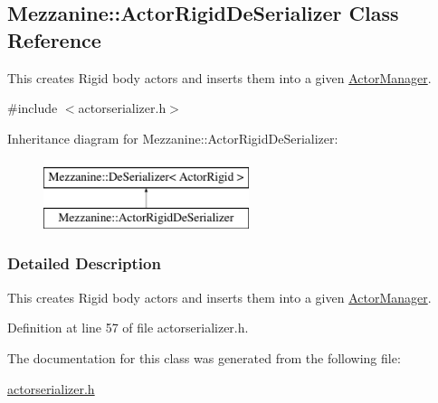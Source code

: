 \hypertarget{classMezzanine_1_1ActorRigidDeSerializer}{
\subsection{Mezzanine::ActorRigidDeSerializer Class Reference}
\label{classMezzanine_1_1ActorRigidDeSerializer}
}


This creates Rigid body actors and inserts them into a given \hyperlink{classMezzanine_1_1ActorManager}{ActorManager}.  




{\ttfamily \#include $<$actorserializer.h$>$}

Inheritance diagram for Mezzanine::ActorRigidDeSerializer:\begin{figure}[H]
\begin{center}
\leavevmode
\includegraphics[height=2.000000cm]{classMezzanine_1_1ActorRigidDeSerializer}
\end{center}
\end{figure}


\subsubsection{Detailed Description}
This creates Rigid body actors and inserts them into a given \hyperlink{classMezzanine_1_1ActorManager}{ActorManager}. 

Definition at line 57 of file actorserializer.h.



The documentation for this class was generated from the following file:\begin{DoxyCompactItemize}
\item 
\hyperlink{actorserializer_8h}{actorserializer.h}\end{DoxyCompactItemize}
